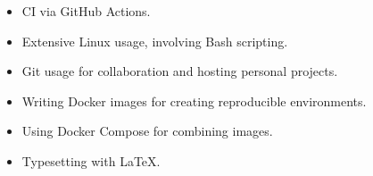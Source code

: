 \documentclass[12pt]{article}
\begin{document}
\begin{adjustwidth}{0.5cm}{0.5cm}
{\begin{tcolorbox}[colback=Grey,colframe=Green, sharp corners, leftrule=1mm, toprule=0mm, bottomrule=0mm, rightrule=0mm]
\begin{tcolorbox}[colback=LightGrey,colframe=Red,sharp corners, leftrule=1mm, toprule=0mm, bottomrule=0mm, rightrule=0mm]
{\begin{itemize}
                        \item CI via {\color{DarkCyan}GitHub Actions}.
                        \item Extensive {\color{DarkCyan}Linux} usage, involving  {\color{DarkCyan}Bash} scripting.
                        \item {\color{DarkCyan}Git} usage for collaboration and hosting personal projects.
                        \item Writing {\color{DarkCyan}Docker} images for creating reproducible environments.
                        \item Using {\color{DarkCyan}Docker Compose} for combining images.
                        \item Typesetting with {\selectfont\color{DarkCyan}\LaTeX}.
                    \end{itemize}
                }
            \end{tcolorbox}
        \end{tcolorbox}
    }
    \end{adjustwidth}

        \pagebreak
\end{document}
